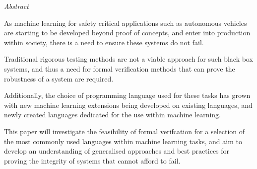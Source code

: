 \documentclass[11pt, oneside]{Thesis} %
\begin{document}
{\huge{\textit{Abstract}} \par}{ 

    As machine learning for safety critical applications such as autonomous vehicles are starting to be developed beyond proof of concepts, and enter into 
    production within society, there is a need to ensure these systems do not fail.

    Traditional rigorous testing methods are not a viable approach for such black box systems, and thus a need for formal verification methods that can 
    prove the robustness of a system are required.

    Additionally, the choice of programming language used for these tasks has grown with new machine learning extensions being developed on existing languages, and 
    newly created languages dedicated for the use within machine learning.

    This paper will investigate the feasibility of formal verifcation for a selection of the most commonly used languages within machine learning tasks, and aim to develop an understanding 
    of generalised approaches and best practices for proving the integrity of systems that cannot afford to fail. 


    \clearpage %






    \pagestyle{fancy} %

}
\end{document}
